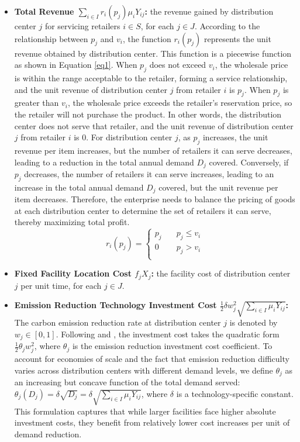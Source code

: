 \documentclass[]{article}
\theoremstyle{plain}%
\theoremstyle{definition}
\theoremstyle{remark}
\theoremstyle{plain}%
\begin{document}
    \begin{itemize}
    
\item\textbf{Total Revenue $\sum_{i\in I}r_i(p_j)\mu_iY_{ij}$:} the revenue gained by distribution center $j$ for servicing retailers $i\in S$, for each $j\in J$. According to the relationship between $p_j$ and $v_i$, the function $r_i(p_j)$ represents the unit revenue obtained by distribution center. This function is a piecewise function as shown in Equation \ref{eq1}. When $p_j$ does not exceed $v_i$, the wholesale price is within the range acceptable to the retailer, forming a service relationship, and the unit revenue of distribution center $j$ from retailer $i$ is $p_j$. When $p_j$ is greater than $v_i$, the wholesale price exceeds the retailer's reservation price, so the retailer will not purchase the product. In other words, the distribution center does not serve that retailer, and the unit revenue of distribution center $j$ from retailer $i$ is $0$. For distribution center $j$, as $p_j$ increases, the unit revenue per item increases, but the number of retailers it can serve decreases, leading to a reduction in the total annual demand $D_j$ covered. Conversely, if $p_j$ decreases, the number of retailers it can serve increases, leading to an increase in the total annual demand $D_j$ covered, but the unit revenue per item decreases. Therefore, the enterprise needs to balance the pricing of goods at each distribution center to determine the set of retailers it can serve, thereby maximizing total profit. 
    \begin{equation}
        \label{eq1}
        r_i(p_j)=\left \{
        \begin{aligned}
            p_j & \quad p_j \leq v_i \\
            0 & \quad p_j > v_i \\  
        \end{aligned}
        \right.
    \end{equation}
    
\noindent\item\textbf{Fixed Facility Location Cost $f_jX_j$:} the facility cost of distribution center $j$ per unit time, for each $j\in J$.

\noindent\item\textbf{Emission Reduction Technology Investment Cost $\frac{1}{2}\delta w^2_j \sqrt{\sum_{i\in I}\mu_iY_{ij}} $:} 
The carbon emission reduction rate at distribution center $j$ is denoted by $w_j \in [0,1]$. Following \cite{dong2016sustainability} and \cite{liu2023study}, the investment cost takes the quadratic form $ \frac{1}{2}\theta_j w^2_j $, where $\theta_j$ is the emission reduction investment cost coefficient. To account for economies of scale and the fact that emission reduction difficulty varies across distribution centers with different demand levels, we define $\theta_j$ as an increasing but concave function of the total demand served: $\theta_j(D_j) = \delta \sqrt{D_j} = \delta \sqrt{\sum_{i\in I}\mu_i Y_{ij}}$, where $\delta$ is a technology-specific constant. This formulation captures that while larger facilities face higher absolute investment costs, they benefit from relatively lower cost increases per unit of demand reduction.
    

\end{itemize}
\end{document}
